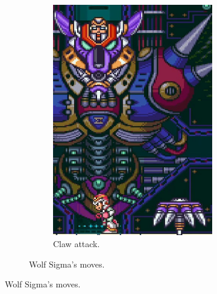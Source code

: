 \begin{figure}[htp]
\begin{figure}[htp]
\begin{subfigure}[t]{0.3\linewidth}
		\includegraphics[width=\linewidth]{figures/X1/Sigma_stages/WolfSigma_claw.jpg}
		\caption{Claw attack.}
	\end{subfigure}
	\caption{Wolf Sigma's moves.}
\end{figure} 



\end{figure}
